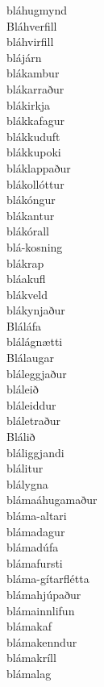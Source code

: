 \documentclass[../samsetningasafn.tex]{subfiles}
\begin{document}
\begin{bigwordlist}
\begin{footnotesize}
\begin{multicols}{4}
\begin{description}
		\item [bláhugmynd]
		\item [Bláhverfill]
		\item [bláhvirfill]
		\item [blájárn]
		\item [blákambur]
		\item [blákarraður]
		\item [blákirkja]
		\item [blákkafagur]
		\item [blákkuduft]
		\item [blákkupoki]
		\item [bláklappaður]
		\item [blákollóttur]
		\item [blákóngur]
		\item [blákantur]
		\item [blákórall]
		\item [blá-kosning]
		\item [blákrap]
		\item [bláakufl]
		\item [blákveld]
		\item [blákynjaður]
		\item [Bláláfa]
		\item [blálágnætti]
		\item [Blálaugar]
		\item [bláleggjaður]
		\item [bláleið]
		\item [bláleiddur]
		\item [bláletraður]
		\item [Blálið]
		\item [bláliggjandi]
		\item [blálitur]
		\item [blálygna]
		\item [blámaáhugamaður]
		\item [bláma-altari]
		\item [blámadagur]
		\item [blámadúfa]
		\item [blámafursti]
		\item [bláma-gítarflétta]
		\item [blámahjúpaður]
		\item [blámainnlifun]
		\item [blámakaf]
		\item [blámakenndur]
		\item [blámakríll]
		\item [blámalag]

\end{description}
\end{multicols}
\end{footnotesize}
\end{bigwordlist}
\end{document}
